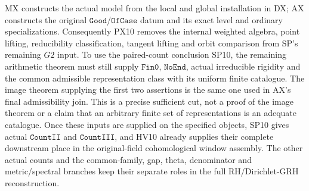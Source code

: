 MX constructs the actual model from the local and
global installation in DX; AX constructs the original
$\mathtt{Good}$/$\mathtt{OfCase}$ datum and its exact
level and ordinary specializations.  Consequently
PX10 removes the internal weighted algebra, point
lifting, reducibility classification, tangent lifting
and orbit comparison from SP's remaining $G2$ input.
To use the paired-count conclusion SP10, the remaining
arithmetic theorem must still supply
$\mathtt{Fin0}$, $\mathtt{NoEnd}$, actual irreducible
rigidity and the common admissible representation
class with its uniform finite catalogue.  The image
theorem supplying the first two assertions is the
same one used in AX's final admissibility join.
This is a precise sufficient cut, not a proof of
the image theorem or a claim that an arbitrary
finite set of representations is an adequate
catalogue.  Once these inputs are supplied on
the specified objects, SP10 gives actual
$\mathtt{CountII}$ and $\mathtt{CountIII}$, and
HV10 already supplies their complete downstream
place in the original-field cohomological window
assembly.  The other actual counts and the
common-family, gap, theta, denominator and
metric/spectral branches keep their separate
roles in the full RH/Dirichlet-GRH reconstruction.
